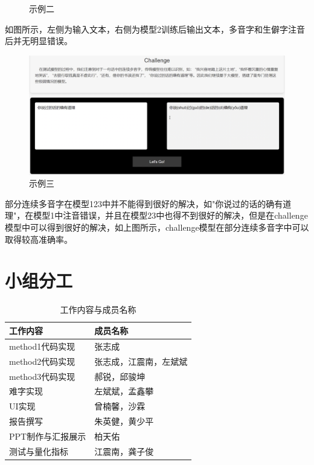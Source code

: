 \documentclass[12pt,hyperref,a4paper,UTF8]{ctexart}
\begin{document}
\begin{itemize}
\begin{itemize}
\begin{figure}[H]
            \caption{示例二}
            \label{9}
        \end{figure}
        如图所示，左侧为输入文本，右侧为模型2训练后输出文本，多音字和生僻字注音后并无明显错误。
        \begin{figure}[H]
            \centering
            \includegraphics[width=0.7\linewidth]{figures/fig10.png}
            \caption{示例三}
            \label{10}
        \end{figure}
        部分连续多音字在模型123中并不能得到很好的解决，如"你说过的话的确有道理"，在模型1中注音错误，并且在模型23中也得不到很好的解决，但是在challenge模型中可以得到很好的解决，如上图所示，challenge模型在部分连续多音字中可以取得较高准确率。
    \end{itemize}
\end{itemize}
\section{小组分工}
\begin{table}[H] %
    \centering
    \begin{tabular}{>{\centering\arraybackslash}p{} >{\centering\arraybackslash}p{}} %
        \toprule
        \textbf{工作内容} & \textbf{成员名称} \\ %
        \midrule
        method1代码实现 & 张志成 \\
        method2代码实现 & 张志成，江震南，左斌斌 \\
        method3代码实现 & 郝锐，邱骏坤 \\
        难字实现 & 左斌斌，孟鑫攀 \\
        UI实现 & 曾楠馨，沙霖 \\
        报告撰写 & 朱英健，黄少平 \\
        PPT制作与汇报展示 & 柏天佑 \\
        测试与量化指标 & 江震南，龚子俊 \\
        \bottomrule
    \end{tabular}
    \caption{工作内容与成员名称}
    \label{tab:work_distribution}
\end{table}


\end{document}
